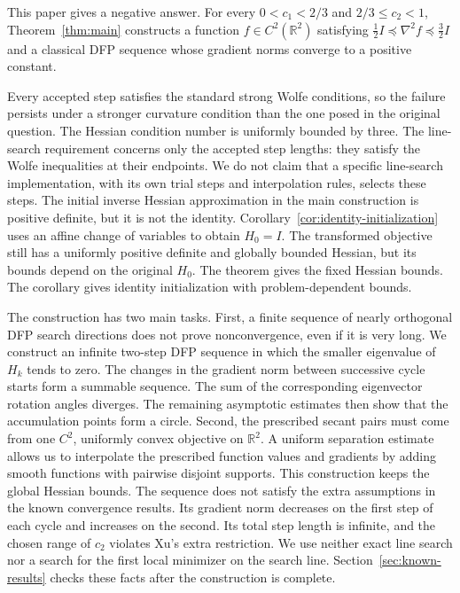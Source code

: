 \documentclass[11pt]{article}
\newcommand{\R}{\mathbb R}
\begin{document}
This paper gives a negative answer.  For every $0<c_1<2/3$ and
$2/3\le c_2<1$, Theorem~\ref{thm:main} constructs a function
$f\in C^2(\R^2)$ satisfying $\frac12I\preceq\nabla^2f\preceq\frac32I$ and a
classical DFP sequence whose gradient norms converge to a positive constant.

Every accepted step satisfies the standard strong Wolfe conditions, so the
failure persists under a stronger curvature condition than the one posed in
the original question.  The Hessian condition number is uniformly bounded by
three.  The line-search requirement concerns only the accepted step lengths:
they satisfy the Wolfe inequalities at their endpoints.  We do not claim that
a specific line-search implementation, with its own trial steps and
interpolation rules, selects these steps.  The initial inverse Hessian
approximation in the main construction is positive definite, but it is not the
identity.  Corollary~\ref{cor:identity-initialization} uses an affine change of
variables to obtain $H_0=I$.  The transformed objective still has a uniformly
positive definite and globally bounded Hessian, but its bounds depend on the
original $H_0$.  The theorem gives the fixed Hessian bounds.  The corollary
gives identity initialization with problem-dependent bounds.


The construction has two main tasks.  First, a finite sequence of nearly
orthogonal DFP search directions does not prove nonconvergence, even if it is
very long.  We construct an infinite two-step DFP sequence in which the
smaller eigenvalue of $H_k$ tends to zero.
The changes in the gradient norm between successive cycle starts form a
summable sequence.  The sum of the corresponding eigenvector rotation angles
diverges.  The remaining asymptotic estimates then show that the accumulation
points form a circle.  Second, the prescribed secant pairs must come from one
$C^2$, uniformly convex objective on $\R^2$.  A uniform separation estimate
allows us to interpolate the prescribed function values and gradients by
adding smooth functions with pairwise disjoint supports.  This construction
keeps the global Hessian bounds.  The sequence does not satisfy the extra
assumptions in the known convergence results.  Its gradient norm decreases on
the first step of each cycle and increases on the second.  Its total step
length is infinite, and the chosen range of $c_2$ violates Xu's extra
restriction.  We use neither exact line search nor a search for the first
local minimizer on the search line.  Section~\ref{sec:known-results} checks
these facts after the construction is complete.
\end{document}
